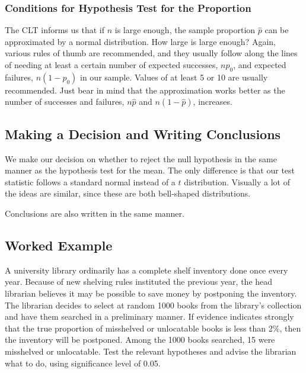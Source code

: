\documentclass[
]{book}
\begin{document}
\subsubsection{Conditions for Hypothesis Test for the Proportion}\label{conditions-for-hypothesis-test-for-the-proportion}

The CLT informs us that if \(n\) is large enough, the sample proportion \(\hat{p}\) can be approximated by a normal distribution. How large is large enough? Again, various rules of thumb are recommended, and they usually follow along the lines of needing at least a certain number of expected successes, \(n p_0\), and expected failures, \(n(1-p_0)\) in our sample. Values of at least 5 or 10 are usually recommended. Just bear in mind that the approximation works better as the number of successes and failures, \(n\hat{p}\) and \(n(1-\hat{p})\), increases.

\subsection{Making a Decision and Writing Conclusions}\label{making-a-decision-and-writing-conclusions}

We make our decision on whether to reject the null hypothesis in the same manner as the hypothesis test for the mean. The only difference is that our test statistic follows a standard normal instead of a \(t\) distribution. Visually a lot of the ideas are similar, since these are both bell-shaped distributions.

Conclusions are also written in the same manner.

\subsection{Worked Example}\label{worked-example-6}

A university library ordinarily has a complete shelf inventory done once every year. Because of new shelving rules instituted the previous year, the head librarian believes it may be possible to save money by postponing the inventory. The librarian decides to select at random 1000 books from the library's collection and have them searched in a preliminary manner. If evidence indicates strongly that the true proportion of misshelved or unlocatable books is less than 2\%, then the inventory will be postponed. Among the 1000 books searched, 15 were misshelved or unlocatable. Test the relevant hypotheses and advise the librarian what to do, using significance level of 0.05.
\end{document}
